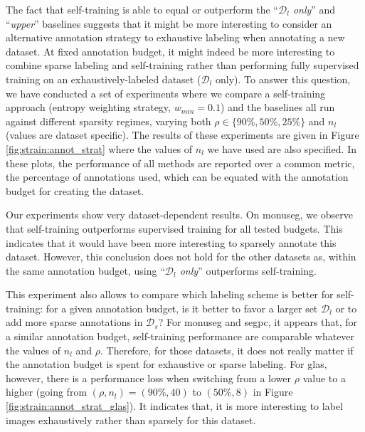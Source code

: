 The fact that self-training is able to equal or outperform the ``\textit{$\mathcal{D}_l$ only}'' and ``\textit{upper}'' baselines suggests that it might be more interesting to consider an alternative annotation strategy to exhaustive labeling when annotating a new dataset. %
At fixed annotation budget, it might indeed be more interesting to combine sparse labeling and self-training rather than performing fully supervised training on an exhaustively-labeled dataset (\ie $\mathcal{D}_l$ only). To answer this question, we have conducted a set of experiments where we compare a self-training approach (entropy weighting strategy, $w_{min} = 0.1$) and the baselines all run against different sparsity regimes, varying both $\rho \in \{90\%, 50\%, 25\%\}$ and $n_l$ (values are dataset specific). The results of these experiments are given in Figure \ref{fig:strain:annot_strat} where the values of $n_l$ we have used are also specified. In these plots, the performance of all methods are reported over a common metric, the percentage of annotations used, which can be equated with the annotation budget for creating the dataset.

Our experiments show very dataset-dependent results. On \acrshort{monuseg}, we observe that self-training outperforms supervised training for all tested budgets. This indicates that it would have been more interesting to sparsely annotate this dataset. However, this conclusion does not hold for the other datasets as, within the same annotation budget, using ``\textit{$\mathcal{D}_l$ only}'' outperforms self-training.

This experiment also allows to compare which labeling scheme is better for self-training: for a given annotation budget, is it better to favor a larger set $\mathcal{D}_l$ or to add more sparse annotations in $\mathcal{D}_s$? For \acrshort{monuseg} and \acrshort{segpc}, it appears that, for a similar annotation budget, self-training performance are comparable whatever the values of $n_l$ and $\rho$. Therefore, for those datasets, it does not really matter if the annotation budget is spent for exhaustive or sparse labeling. For \acrshort{glas}, however, there is a performance loss when switching from a lower $\rho$ value to a higher (\eg going from $(\rho, n_l) = (90\%, 40)$ to $(50\%, 8)$ in Figure \ref{fig:strain:annot_strat_glas}). It indicates that, it is more interesting to label images exhaustively rather than sparsely for this dataset.

